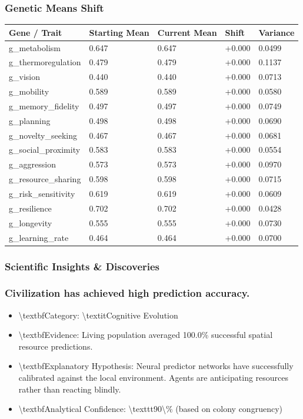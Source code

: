\documentclass[11pt,a4paper]{article}
\begin{document}
\subsubsection*{ Genetic Means Shift}
\begin{longtable}{lllll}
\toprule
Gene / Trait & Starting Mean & Current Mean & Shift & Variance \\
\midrule
\endhead
g\_metabolism & 0.647 & 0.647 & +0.000 & 0.0499 \\
g\_thermoregulation & 0.479 & 0.479 & +0.000 & 0.1137 \\
g\_vision & 0.440 & 0.440 & +0.000 & 0.0713 \\
g\_mobility & 0.589 & 0.589 & +0.000 & 0.0580 \\
g\_memory\_fidelity & 0.497 & 0.497 & +0.000 & 0.0749 \\
g\_planning & 0.498 & 0.498 & +0.000 & 0.0690 \\
g\_novelty\_seeking & 0.467 & 0.467 & +0.000 & 0.0681 \\
g\_social\_proximity & 0.583 & 0.583 & +0.000 & 0.0554 \\
g\_aggression & 0.573 & 0.573 & +0.000 & 0.0970 \\
g\_resource\_sharing & 0.598 & 0.598 & +0.000 & 0.0715 \\
g\_risk\_sensitivity & 0.619 & 0.619 & +0.000 & 0.0609 \\
g\_resilience & 0.702 & 0.702 & +0.000 & 0.0428 \\
g\_longevity & 0.555 & 0.555 & +0.000 & 0.0730 \\
g\_learning\_rate & 0.464 & 0.464 & +0.000 & 0.0700 \\
\bottomrule
\end{longtable}

\subsubsection*{ Scientific Insights \& Discoveries}
\subsubsection*{ Civilization has achieved high prediction accuracy.}
\begin{itemize}
  \item \textbackslash{}textbf{Category:} \textbackslash{}textit{Cognitive Evolution}
  \item \textbackslash{}textbf{Evidence:} Living population averaged 100.0\% successful spatial resource predictions.
  \item \textbackslash{}textbf{Explanatory Hypothesis:} Neural predictor networks have successfully calibrated against the local environment. Agents are anticipating resources rather than reacting blindly.
  \item \textbackslash{}textbf{Analytical Confidence:} \textbackslash{}texttt{90\textbackslash{}\%} (based on colony congruency)
\end{itemize}
\end{document}
